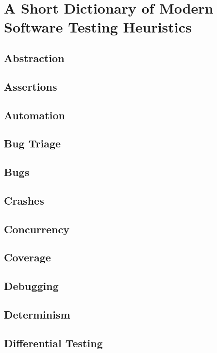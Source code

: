 \chapter{A Short Dictionary of Modern Software Testing Heuristics}

\section{Abstraction}

\section{Assertions}

\section{Automation}

\section{Bug Triage}

\section{Bugs}

\section{Crashes}

\section{Concurrency}

\section{Coverage}

\section{Debugging}

\section{Determinism}

\section{Differential Testing}

